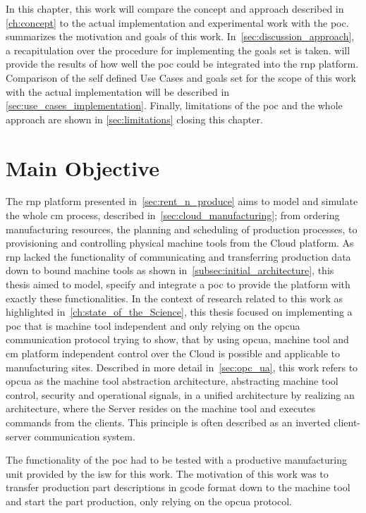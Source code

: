 \documentclass[
a4paper,
twoside,
headsepline,
cleardoublepage=empty,
parskip=half,
draft=false
]{scrbook}
\begin{document}
		In this chapter, this work will compare the concept and approach described in \cref{ch:concept} to the actual implementation and experimental work with the \gls{poc}.
		 summarizes the motivation and goals of this work.
		In~\cref{sec:discussion_approach}, a recapitulation over the procedure for implementing the goals set is taken. 
		 will provide the results of how well the \gls{poc} could be integrated into the \gls{rnp} platform. Comparison of the self defined Use Cases and goals set for the scope of this work with the actual implementation will be described in \cref{sec:use_cases_implementation}. Finally, limitations of the \gls{poc} and the whole approach are shown in \cref{sec:limitations} closing this chapter.
		
		\section{Main Objective}\label{sec:main_objective}
		
			The \gls{rnp} platform presented in~\cref{sec:rent_n_produce} aims to model and simulate the whole \gls{cm} process, described in~\cref{sec:cloud_manufacturing}; from ordering manufacturing resources, the planning and scheduling of production processes, to provisioning and controlling physical machine tools from the Cloud platform. As \gls{rnp} lacked the functionality of communicating and transferring production data down to bound machine tools as shown in~\cref{subsec:initial_architecture}, this thesis aimed to model, specify and integrate a \gls{poc} to provide the platform with exactly these functionalities. In the context of research related to this work as highlighted in~\cref{ch:state_of_the_Science}, this thesis focused on implementing a \gls{poc} that is machine tool independent and only relying on the \gls{opcua} communication protocol trying to show, that by using \gls{opcua}, machine tool and \gls{cm} platform independent control over the Cloud is possible and applicable to manufacturing sites. 
			Described in more detail in~\cref{sec:opc_ua}, this work refers to \gls{opcua} as the machine tool abstraction architecture, abstracting machine tool control, security and operational signals, in a unified architecture by realizing an architecture, where the Server resides on the machine tool and executes commands from the clients. This principle is often described as an inverted client-server communication system.
			
			The functionality of the \gls{poc} had to be tested with a productive manufacturing unit provided by the \gls{isw} for this work.
			The motivation of this work was to transfer production part descriptions in \gls{gcode} format down to the machine tool and start the part production, only relying on the \gls{opcua} protocol.
			
\end{document}
